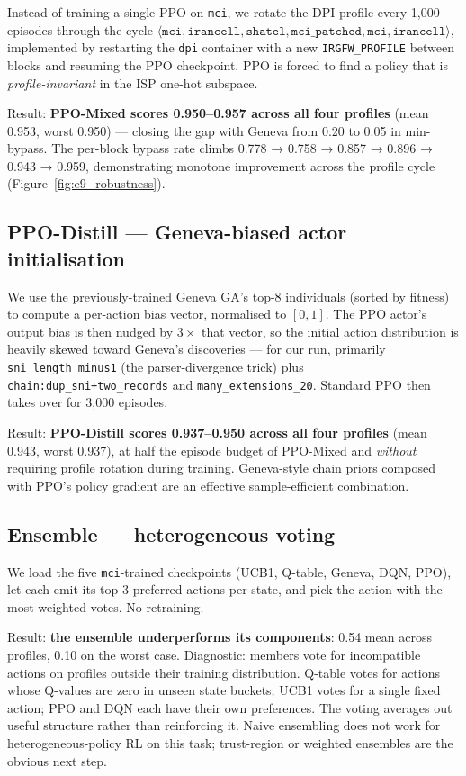 \documentclass[letterpaper,twocolumn,10pt]{article}
\begin{document}
Instead of training a single PPO on \texttt{mci}, we rotate the DPI
profile every 1{,}000 episodes through the cycle
$\langle \texttt{mci}, \texttt{irancell}, \texttt{shatel},
\texttt{mci\_patched}, \texttt{mci}, \texttt{irancell}\rangle$,
implemented by restarting the \texttt{dpi} container with a new
\texttt{IRGFW\_PROFILE} between blocks and resuming the PPO checkpoint.
PPO is forced to find a policy that is \emph{profile-invariant} in the
ISP one-hot subspace.

Result: \textbf{PPO-Mixed scores 0.950--0.957 across all four
profiles} (mean 0.953, worst 0.950) — closing the gap with Geneva
from 0.20 to 0.05 in min-bypass. The per-block bypass rate climbs
0.778 → 0.758 → 0.857 → 0.896 → 0.943 → 0.959, demonstrating monotone
improvement across the profile cycle (Figure~\ref{fig:e9_robustness}).

\subsection{PPO-Distill — Geneva-biased actor initialisation}
\label{sec:novel:ppo_distill}

We use the previously-trained Geneva GA's top-8 individuals (sorted by
fitness) to compute a per-action bias vector, normalised to
$[0, 1]$. The PPO actor's output bias is then nudged by
$3 \times$ that vector, so the initial action distribution is
heavily skewed toward Geneva's discoveries — for our run, primarily
\texttt{sni\_length\_minus1} (the parser-divergence trick) plus
\texttt{chain:dup\_sni+two\_records} and \texttt{many\_extensions\_20}.
Standard PPO then takes over for 3{,}000 episodes.

Result: \textbf{PPO-Distill scores 0.937--0.950 across all four
profiles} (mean 0.943, worst 0.937), at half the episode budget of
PPO-Mixed and \emph{without} requiring profile rotation during
training. Geneva-style chain priors composed with PPO's policy
gradient are an effective sample-efficient combination.

\subsection{Ensemble — heterogeneous voting}
\label{sec:novel:ensemble}

We load the five \texttt{mci}-trained checkpoints (UCB1, Q-table,
Geneva, DQN, PPO), let each emit its top-3 preferred actions per state,
and pick the action with the most weighted votes. No retraining.

Result: \textbf{the ensemble underperforms its components}: 0.54 mean
across profiles, 0.10 on the worst case. Diagnostic: members vote for
incompatible actions on profiles outside their training distribution.
Q-table votes for actions whose Q-values are zero in unseen state
buckets; UCB1 votes for a single fixed action; PPO and DQN each have
their own preferences. The voting averages out useful structure rather
than reinforcing it. Naive ensembling does not work for
heterogeneous-policy RL on this task; trust-region or weighted
ensembles are the obvious next step.
\end{document}
